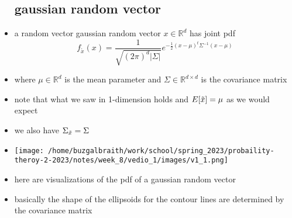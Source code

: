 \documentclass{article}
\begin{document}
\begin{itemize}
\subsection*{gaussian random vector}
\item a random vector gaussian random vector $x\in \mathbb{R}^{d}$ has joint pdf $$f_{\tilde{x}}(x)=\frac{1}{\sqrt{(2\pi)^d|\Sigma
|}}e^{-\frac{1}{2}(x-\mu)^t\Sigma^{-1}(x-\mu)}$$
\item where $\mu\in \mathbb{R}^d$ is the mean parameter and $\Sigma\in \mathbb{R}^{d\times d }$ is the covariance matrix 
\item note that what we saw in 1-dimension holds and $E[\Tilde{x}]=\mu$ as we would expect
\item we also have $\Sigma_{\Tilde{x}}=\Sigma$
\item \texttt{[image: /home/buzgalbraith/work/school/spring\_2023/probaility-theroy-2-2023/notes/week\_8/vedio\_1/images/v1\_1.png]}
\item here are visualizations of the pdf of a gaussian random vector 
\item basically the shape of the ellipsoids for the contour lines are determined by the covariance matrix

\end{itemize}
\end{document}
